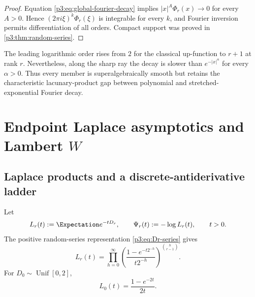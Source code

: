 \documentclass[11pt,oneside]{article}
\theoremstyle{definition}
\theoremstyle{remark}
\begin{document}
\begin{proof}
Equation \eqref{p3:eq:global-fourier-decay} implies $|x|^A\Phi_r(x)\to0$ for every $A>0$.  Hence $(2\pi i\xi)^k\Phi_r(\xi)$ is integrable for every $k$, and Fourier inversion permits differentiation of all orders.  Compact support was proved in \cref{p3:thm:random-series}.
\end{proof}

\begin{remark}
The leading logarithmic order rises from $2$ for the classical up-function to $r+1$ at rank $r$.  Nevertheless, along the sharp ray the decay is slower than $e^{-|x|^\alpha}$ for every $\alpha>0$.  Thus every member is superalgebraically smooth but retains the characteristic lacunary-product gap between polynomial and stretched-exponential Fourier decay.
\end{remark}

\section{Endpoint Laplace asymptotics and Lambert \texorpdfstring{$W$}{W}}\label{p3:sec:endpoint}

\subsection{Laplace products and a discrete-antiderivative ladder}

Let
\begin{equation}\label{p3:eq:Lr-Psir}
  L_r(t):=\Expectation e^{-tD_r},
  \qquad
  \Psi_r(t):=-\log L_r(t),
  \qquad t>0.
\end{equation}
The positive random-series representation \eqref{p3:eq:Dr-series} gives
\begin{equation}\label{p3:eq:Lr-product}
 L_r(t)=\prod_{h=0}^{\infty}
 \left(\frac{1-e^{-t2^{-h}}}{t2^{-h}}\right)^{\binom h{r-1}}.
\end{equation}
For $D_0\sim\operatorname{Unif}[0,2]$,
\begin{equation}\label{p3:eq:L0}
  L_0(t)=\frac{1-e^{-2t}}{2t}.
\end{equation}
\end{document}
